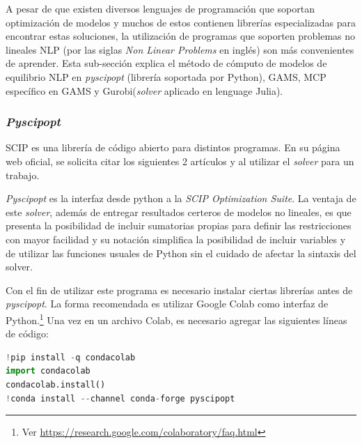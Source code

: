 A pesar de que existen diversos lenguajes de programación que soportan optimización de modelos y muchos de estos contienen librerías especializadas para encontrar estas soluciones, la utilización de programas que soporten problemas no lineales NLP (por las siglas \emph{Non Linear Problems} en inglés) son más convenientes de aprender. Esta sub-sección explica el método de cómputo de modelos de equilibrio NLP en \textit{pyscipopt} (librería soportada por Python), GAMS, MCP específico en GAMS y Gurobi(\textit{solver} aplicado en lenguage Julia).

\subsubsection{\textit{Pyscipopt}}

SCIP es una librería de código abierto para distintos programas. En su página web oficial, se solicita citar los siguientes 2 artículos 
y  al utilizar el \textit{solver} para un trabajo. 
\vspace{2.5mm}

\textit{Pyscipopt} es la interfaz desde python a la \textit{SCIP Optimization Suite}. La ventaja de este \textit{solver}, además de entregar resultados certeros de modelos no lineales, es que presenta la posibilidad de incluir sumatorias propias para definir las restricciones con mayor facilidad y su notación simplifica la posibilidad de incluir variables y de utilizar las funciones usuales de Python sin el cuidado de afectar la sintaxis del solver.
\vspace{2.5mm}

Con el fin de utilizar este programa es necesario instalar ciertas librerías antes de \textit{pyscipopt}. La forma recomendada es utilizar Google Colab como interfaz de Python.\footnote{Ver \url{https://research.google.com/colaboratory/faq.html}} Una vez en un archivo Colab, es necesario agregar las siguientes líneas de código:

\begin{footnotesize}
\begin{lstlisting}[language=Python]
!pip install -q condacolab
import condacolab            
condacolab.install()
!conda install --channel conda-forge pyscipopt
\end{lstlisting}
\end{footnotesize}


